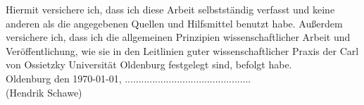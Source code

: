 \thispagestyle{empty}
Hiermit versichere ich, dass ich diese Arbeit selbstständig verfasst und
keine anderen als die angegebenen Quellen und Hilfsmittel benutzt habe.
Außerdem ver\-sichere ich, dass ich die allgemeinen Prinzipien
wissenschaftlicher Arbeit und Veröffentlichung, wie sie in den
Leitlinien guter wissenschaftlicher Praxis der Carl von Ossietzky
Universität Oldenburg festgelegt sind, befolgt habe.\\[3cm]

\raggedleft
\hfill Oldenburg den \today, ..............................................\\
\hfill (Hendrik Schawe)\\
